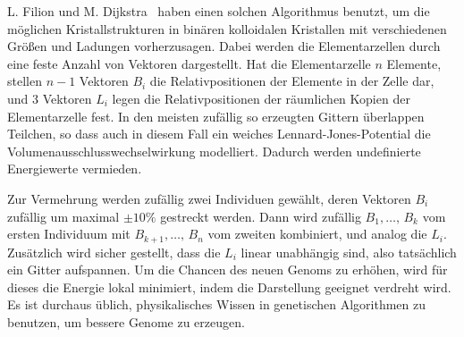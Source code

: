 L. Filion und M. Dijkstra~\cite{filion09a} haben einen solchen
Algorithmus benutzt, um die möglichen Kristallstrukturen in binären
kolloidalen Kristallen mit verschiedenen Größen und Ladungen
vorherzusagen. Dabei werden die Elementarzellen durch eine feste
Anzahl von Vektoren dargestellt. Hat die Elementarzelle $n$ Elemente,
stellen $n-1$ Vektoren $B_i$ die Relativpositionen der Elemente in der
Zelle dar, und 3 Vektoren $L_i$ legen die Relativpositionen der
räumlichen Kopien der Elementarzelle fest. In den meisten zufällig so
erzeugten Gittern überlappen Teilchen, so dass auch in diesem Fall ein
weiches Lennard-Jones-Potential die Volumenausschlusswechselwirkung
modelliert. Dadurch werden undefinierte Energiewerte vermieden.

Zur Vermehrung werden zufällig zwei Individuen gewählt, deren Vektoren
$B_i$ zufällig um maximal $\pm 10\%$ gestreckt werden. Dann wird
zufällig $B_1,\ldots,\,B_k$ vom ersten Individuum mit
$B_{k+1},\ldots,\,B_n$ vom zweiten kombiniert, und analog die
$L_i$. Zusätzlich wird sicher gestellt, dass die $L_i$ linear
unabhängig sind, also tatsächlich ein Gitter aufspannen. Um die
Chancen des neuen Genoms zu erhöhen, wird für dieses die Energie lokal
minimiert, indem die Darstellung geeignet verdreht wird. Es ist durchaus
üblich, physikalisches Wissen in genetischen Algorithmen zu benutzen,
um bessere Genome zu erzeugen.

